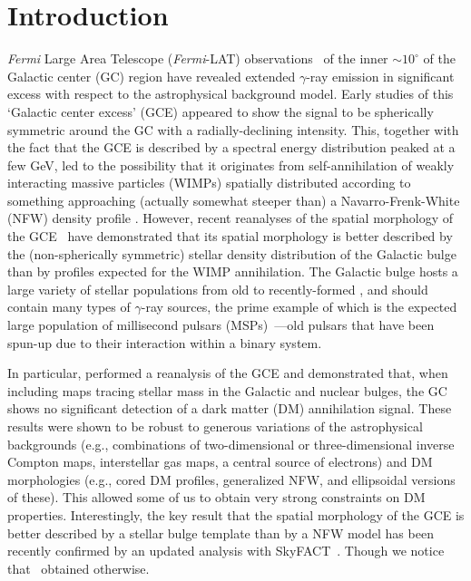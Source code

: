 \documentclass[doublespace,draft,nopageskip]{VTthesis} %
\begin{document}
\section{Introduction}
\label{sec:introduction}


\textit{Fermi} Large Area Telescope (\textit{Fermi}-LAT) observations~\citep{Hooper:2010mq,Abazajian:2010zy,Abazajian:2012pn,Gordon:2013vta, Macias:2013vya,Calore:2014xka,Daylan:2014rsa,TheFermi-LAT:2015kwa,TheFermi-LAT:2017vmf} of the inner $\sim 10^{\circ}$ of the Galactic center (GC) region have revealed extended  $\gamma$-ray emission in significant excess with respect to the astrophysical background model. Early studies of this `Galactic center excess' (GCE) appeared to show the signal to be spherically symmetric around the GC with a radially-declining intensity. This, together with the fact that the GCE is described by a 
spectral energy distribution peaked at a few GeV,
led to the possibility that it
originates from
self-annihilation of  weakly interacting massive particles (WIMPs) spatially distributed 
according to something approaching (actually somewhat steeper than)
a Navarro-Frenk-White (NFW) density profile 
\citep{Hooper:2010mq,Abazajian:2012pn,Gordon:2013vta}. However, recent reanalyses of the spatial morphology of the GCE~\citep{Macias:2016nev,Bartels:2017vsx,Macias:2019omb, Abazajian:2020tww} have demonstrated that its spatial morphology is better described by the (non-spherically symmetric) stellar density distribution of the Galactic bulge than by profiles expected for the WIMP annihilation. The Galactic bulge hosts a large variety of stellar populations from old to 
recently-formed
\citep{Garzon:1997cs,Hammersley:2000mx}, and should contain many 
types of
$\gamma$-ray sources, 
the prime example of which is the expected large population of millisecond pulsars (MSPs)~\citep{Abazajian:2010zy,Abazajian:2012pn,Gordon:2013vta,Ploeg:2017vai, Fragione:2017rsp, Fragione:2018jxd, Gonthier:2018ymi, Ploeg:2020jeh}---old pulsars that have been spun-up due to their
interaction within a binary system.

In particular, \citet{Abazajian:2020tww} performed a reanalysis of the GCE and demonstrated that, when including maps tracing stellar mass in the Galactic and nuclear bulges, the GC shows no significant detection of a dark matter (DM) annihilation signal. These results were shown to be robust to generous variations of the astrophysical backgrounds (e.g., combinations of two-dimensional or three-dimensional inverse Compton maps, interstellar gas maps, a central source of electrons) and DM morphologies (e.g., cored DM profiles, generalized NFW, and ellipsoidal versions of these). This allowed some of us to obtain very strong constraints on DM properties. Interestingly, the key result that the spatial morphology of the GCE is better described by a stellar bulge template than by a NFW model has been recently confirmed by an updated analysis with SkyFACT~\citep{Calore:2021bty}. Though we notice that~\cite{DiMauro:2021raz} obtained otherwise.
\end{document}

